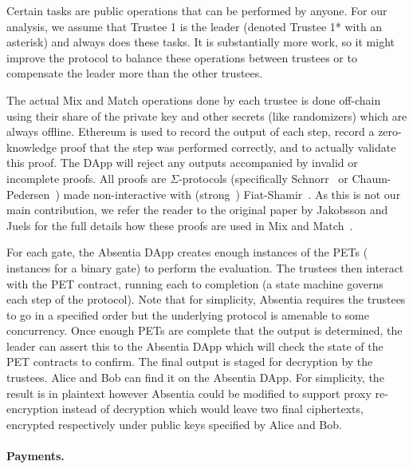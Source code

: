 Certain tasks are public operations that can be performed by anyone. For our analysis, we assume that Trustee 1 is the leader (denoted Trustee 1* with an asterisk) and always does these tasks. It is substantially more work, so it might improve the protocol to balance these operations between trustees or to compensate the leader more than the other trustees.

The actual Mix and Match operations done by each trustee is done off-chain using their share of the private key and other secrets (like randomizers) which are always offline. Ethereum is used to record the output of each step, record a zero-knowledge proof that the step was performed correctly, and to actually validate this proof. The DApp will reject any outputs accompanied by invalid or incomplete proofs. All proofs are $\Sigma$-protocols (specifically Schnorr~\cite{Sch91} or Chaum-Pedersen~\cite{CP92}) made non-interactive with (strong~\cite{BPW12}) Fiat-Shamir~\cite{FS86}. As this is not our main contribution,  we refer the reader to the original paper by Jakobsson and Juels for the full details how these proofs are used in Mix and Match~\cite{JJ00}.
 
For each gate, the Absentia DApp creates enough instances of the PETs ( instances for a binary gate) to perform the evaluation. The trustees then interact with the PET contract, running each to completion (a state machine governs each step of the protocol). Note that for simplicity, Absentia requires the trustees to go in a specified order but the underlying protocol is amenable to some concurrency. Once enough PETs are complete that the output is determined, the leader can assert this to the Absentia DApp which will check the state of the PET contracts to confirm. The final output is staged for decryption by the trustees. Alice and Bob can find it on the Absentia DApp. For simplicity, the result is in plaintext however Absentia could be modified to support proxy re-encryption instead of decryption which would leave two final ciphertexts,  encrypted respectively under public keys specified by Alice and Bob. 


\paragraph{Payments.}

